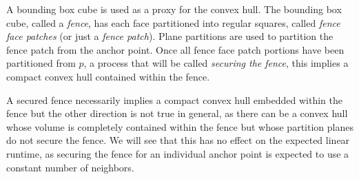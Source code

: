 \documentclass[a4paper,fleqn]{cas-dc}
\begin{document}
%


A bounding box cube is used as a proxy for the convex hull.
The bounding box cube, called a \emph{fence}, has each face partitioned into regular squares,
called \emph{fence face patches} (or just a \emph{fence patch}).
Plane partitions are used to partition the fence patch from the anchor point.
Once all fence face patch portions have been partitioned from $p$, a process that will be called \emph{securing the fence},
this implies a compact convex hull contained within the fence.


A secured fence necessarily implies a compact convex hull embedded within the fence but the other direction
is not true in general, as there can be a convex hull whose volume is completely contained within the
fence but whose partition planes do not secure the fence.
We will see that this has no effect on the expected linear runtime, as securing the fence for an individual
anchor point is expected to use a constant number of neighbors.
\end{document}

